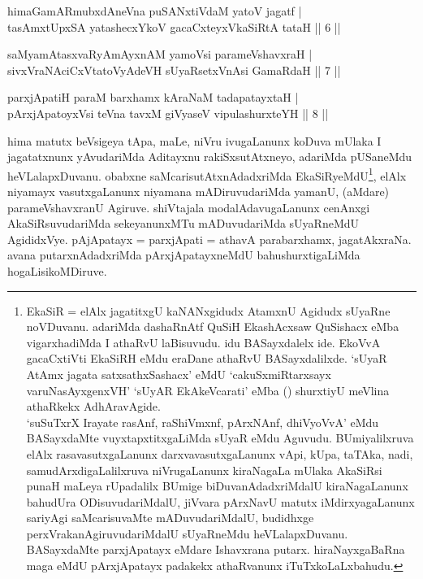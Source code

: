 
\begin{shl}
himaGamARmubxdAneVna puSANxtiVdaM yatoV jagatf | \\
tasAmxtUpxSA yatashecxYkoV gacaCxteyxVkaSiRtA tataH \hfill||  6 || 
\end{shl}

\begin{shl}
saMyamAtasxvaRyAmAyxnAM yamoV\s si parameVshavxraH | \\
sivxVraNAciCxVtatoVyAdeVH sUyaRsetxVnAsi GamaRdaH \hfill||  7 ||
\end{shl}

\begin{shl}
parxjApatiH paraM barxhamx kAraNaM tadapatayxtaH | \\
pArxjApatoyxV\s si teVna tavxM giVyaseV vipulashurxteYH \hfill||  8 || 
\end{shl}

\begin{artha} 
hima matutx beVsigeya tApa, maLe, niVru ivugaLanunx koDuva mUlaka I 
jagatatxnunx yAvudariMda Aditayxnu rakiSxsutAtxneyo, adariMda 
pUSaneMdu heVLalapxDuvanu. obabxne saMcarisutAtxnAdadxriMda 
EkaSiRyeMdU\footnote{EkaSiR = elAlx jagatitxgU kaNANxgidudx AtamxnU 
Agidudx sUyaRne noVDuvanu. adariMda dashaRnAtf QuSiH EkashAcxsaw 
QuSishacx eMba vigarxhadiMda I athaRvU laBisuvudu. idu BASayxdalelx 
ide. EkoVvA gacaCxtiVti EkaSiRH eMdu eraDane athaRvU BASayxdalilxde. 
`sUyaR AtAmx jagata satxsathxSashacx' eMdU `cakuSxmiRtarxsayx 
varuNasAyxgenxVH' `sUyAR EkAkeVcarati' eMba () shurxtiyU meVlina 
athaRkekx AdhAravAgide.\\ 
`suSuTxrX Irayate rasAnf, raShiVmxnf, pArxNAnf, dhiVyoVvA' eMdu BASayxdaMte vuyxtapxtitxgaLiMda sUyaR eMdu Aguvudu. 
BUmiyalilxruva elAlx rasavasutxgaLanunx darxvavasutxgaLanunx vApi, 
kUpa, taTAka, nadi, samudArxdigaLalilxruva niVrugaLanunx kiraNagaLa 
mUlaka AkaSiRsi punaH maLeya rUpadalilx BUmige biDuvanAdadxriMdalU 
kiraNagaLanunx bahudUra ODisuvudariMdalU, jiVvara pArxNavU matutx 
iMdirxyagaLanunx sariyAgi saMcarisuvaMte mADuvudariMdalU, budidhxge 
perxVrakanAgiruvudariMdalU sUyaRneMdu heVLalapxDuvanu. BASayxdaMte 
parxjApatayx eMdare Ishavxrana putarx. hiraNayxgaBaRna maga eMdU 
pArxjApatayx padakekx athaRvanunx iTuTxkoLaLxbahudu.}, 
elAlx niyamayx vasutxgaLanunx niyamana 
mADiruvudariMda yamanU, (aMdare) parameVshavxranU Agiruve. shiVtajala 
modalAdavugaLanunx cenAnxgi AkaSiRsuvudariMda sekeyanunxMTu 
mADuvudariMda sUyaRneMdU AgididxVye. pAjApatayx = parxjApati = athavA 
parabarxhamx, jagatAkxraNa. avana putarxnAdadxriMda pArxjApatayxneMdU 
bahushurxtigaLiMda hogaLisikoMDiruve.
\end{artha}

